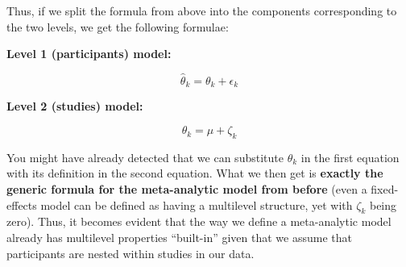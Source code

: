 \documentclass[]{book}
\begin{document}
\begin{rmdinfo}
Thus, if we split the formula from above into the components
corresponding to the two levels, we get the following formulae:

\textbf{Level 1 (participants) model:}

\begin{equation}
  \label{eq:1}
  \hat\theta_k = \theta_k + \epsilon_k
\end{equation}

\textbf{Level 2 (studies) model:}

\begin{equation}
  \label{eq:2}
  \theta_k = \mu + \zeta_k
\end{equation}

You might have already detected that we can substitute \(\theta_k\) in
the first equation with its definition in the second equation. What we
then get is \textbf{exactly the generic formula for the meta-analytic
model from before} (even a fixed-effects model can be defined as having
a multilevel structure, yet with \(\zeta_k\) being zero). Thus, it
becomes evident that the way we define a meta-analytic model already has
multilevel properties ``built-in'' given that we assume that
participants are nested within studies in our data.
\end{rmdinfo}
\end{document}
